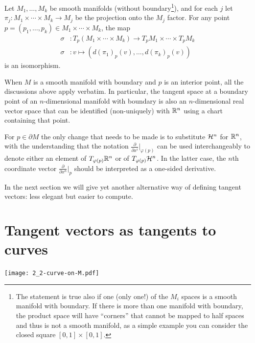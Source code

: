 \begin{exercise}
	Let $M_1, \ldots, M_k$ be smooth manifolds (without boundary\footnote{The statement is true also if one (only one!) of the $M_i$ spaces is a smooth manifold with boundary. If there is more than one manifold with boundary, the product space will have ``corners'' that cannot be mapped to half spaces and thus is not a smooth manifold, as a simple example you can consider the closed square $[0,1]\times [0,1]$.}), and for each $j$ let $\pi_j:M_1\times\cdots\times M_k \to M_j$ be the projection onto the $M_j$ factor.
	For any point $p=(p_1,\ldots,p_k)\in M_1\times\cdots\times M_k$, the map
	\begin{align}
		\sigma & : T_p(M_1\times\cdots\times M_k) \to T_p M_1\times\cdots\times T_p M_k \\
		\sigma & : v \mapsto \left(d(\pi_1)_p(v), \ldots, d(\pi_k)_p(v)\right)
	\end{align}
	is an isomorphism.
\end{exercise}

\begin{remark}
	When $M$ is a smooth manifold with boundary and $p$ is an interior point, all the discussions above apply verbatim. In particular, the tangent space at a boundary point of an $n$-dimensional manifold with boundary is also an $n$-dimensional real vector space that can be identified (non-uniquely) with $\mathbb{R}^n$ using a chart containing that point.

	For $p\in\partial M$ the only change that needs to be made is to substitute $\mathcal{H}^n$ for $\mathbb{R}^n$, with the understanding that the notation $\frac{\partial}{\partial x^i}\big|_{\varphi(p)}$ can be used interchangeably to denote either an element of $T_{\varphi(p)}\mathbb{R}^n$ or of $T_{\varphi(p)}\mathcal{H}^n$. In the latter case, the $n$th coordinate vector $\frac{\partial}{\partial x^n}\big|_{p}$ should be interpreted as a one-sided derivative.
\end{remark}

In the next section we will give yet another alternative way of defining tangent vectors: less elegant but easier to compute.


\section{Tangent vectors as tangents to curves}

\begin{marginfigure}[1em]
	\texttt{[image: 2\_2-curve-on-M.pdf]}
\end{marginfigure}

